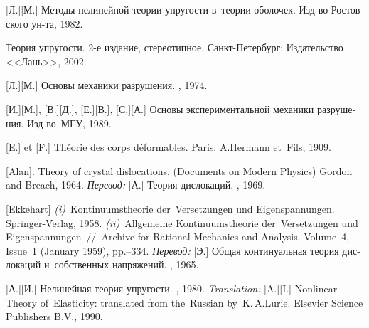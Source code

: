 \begin{thebibliography}{123}
\begin{otherlanguage}{russian}
[Л.][М.]
Методы нелинейной теории упругости в~теории оболочек.
Изд\hbox{-}во Ростовского ун\hbox{-}та, 1982.

Теория упругости.
2-е издание, стереотипное.
{Санкт-Петербург}:
Издательство <<Лань>>, 2002.

[Л.][М.]
Основы механики разрушения.
\naukapublisher,
1974.

[И.][М.], [В.][Д.], [Е.][В.], [С.][А.]
Основы экспериментальной механики разрушения. Изд\hbox{-}во~МГУ, 1989. 

[E.] et [F.]
\href{
   https://jscholarship.library.jhu.edu/bitstream/handle/1774.2/34209/31151000327233.pdf
}{
   Théorie des corps déformables.
   Paris:
   A.\:Hermann et~Fils,
   1909.
}

[Alan]. Theory of crystal dislocations. (Documents on Modern Physics) Gordon and Breach, 1964. 
\emph{Перевод:} [А.] Теория дислокаций. \mirpublisher, 1969. 

[Ekkehart] \emph{(i)}~Kontinuumstheorie der~Versetzungen und Eigen\-spannung\-en. Springer\hbox{-}Verlag, 1958. 
\emph{(ii)}~Allgemeine Kontinuumstheorie der~Versetzungen und Eigen\-span\-nung\-en~//~Archive for Rational Mechanics and Analysis. Volume~4, Issue~1 (January 1959), pp.\hbox{--}334.
\emph{Перевод:} [Э.] Общая континуальная теория дислокаций и~собственных напряжений. \mirpublisher, 1965. 

[А.][И.] Нелинейная теория упругости. \naukapublisher, 1980. 
\emph{Translation:}
[A.][I.] Nonlinear Theory of~Elasticity: translated from the~Russian by~K.\,A.\;Lurie. Elsevier Science Publishers B.\hspace{.1ex}V\hspace{-0.2ex}., 1990. 


\end{otherlanguage}
\end{thebibliography}
